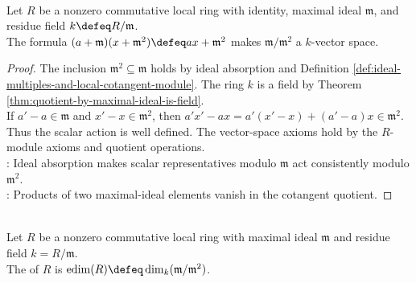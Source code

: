 \begin{proposition} \label{prop:local-cotangent-residue-vector-space}
\\
Let $R$ be a nonzero commutative local ring with identity, maximal ideal $\mathfrak{m}$, and residue field $k\defeq R/\mathfrak{m}$.\\
The formula $(a+\mathfrak{m})(x+\mathfrak{m}^2)\defeq ax+\mathfrak{m}^2$ makes $\mathfrak{m}/\mathfrak{m}^2$ a $k$-vector space.
\begin{proof}
The inclusion $\mathfrak{m}^2\subseteq\mathfrak{m}$ holds by ideal absorption and Definition \ref{def:ideal-multiples-and-local-cotangent-module}. The ring $k$ is a field by Theorem \ref{thm:quotient-by-maximal-ideal-is-field}.\\
If $a'-a\in\mathfrak{m}$ and $x'-x\in\mathfrak{m}^2$, then $a'x'-ax=a'(x'-x)+(a'-a)x\in\mathfrak{m}^2$.\\
Thus the scalar action is well defined. The vector-space axioms hold by the $R$-module axioms and quotient operations.\\
: Ideal absorption makes scalar representatives modulo $\mathfrak{m}$ act consistently modulo $\mathfrak{m}^2$.\\
: Products of two maximal-ideal elements vanish in the cotangent quotient.
\end{proof}
\end{proposition}

\begin{definition} \label{def:embedding-dimension} \\
Let $R$ be a nonzero commutative local ring with maximal ideal $\mathfrak{m}$ and residue field $k=R/\mathfrak{m}$.\\
The  of $R$ is $\operatorname{edim}(R)\defeq\dim_k(\mathfrak{m}/\mathfrak{m}^2)$.
\end{definition}

